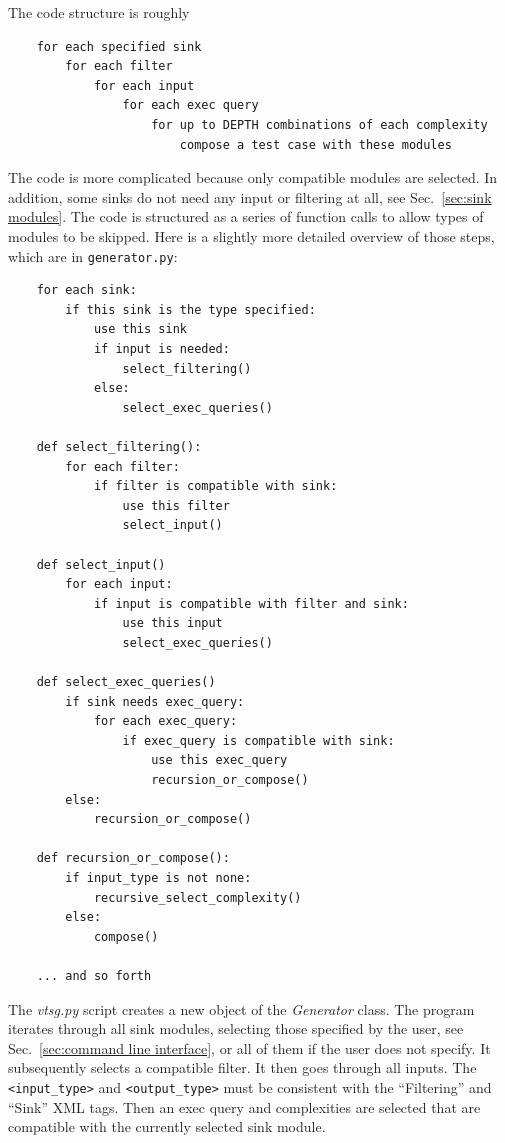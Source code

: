\documentclass[12pt]{article}
\begin{document}
The code structure is roughly
\begin{verbatim}
    for each specified sink
        for each filter
            for each input
                for each exec query
                    for up to DEPTH combinations of each complexity
                        compose a test case with these modules
\end{verbatim}
The code is more complicated because only compatible modules are 
selected.
In addition, some sinks do not need any input or filtering at all,
see Sec.~\ref{sec:sink modules}.
The
code is structured as a series of function calls to allow types
of modules to be skipped.  Here is a slightly more detailed
overview of those steps, which are in \verb|generator.py|:
\begin{verbatim}
    for each sink:
        if this sink is the type specified:
            use this sink
            if input is needed:
                select_filtering()
            else:
                select_exec_queries()
    
    def select_filtering():
        for each filter:
            if filter is compatible with sink:
                use this filter
                select_input()
    
    def select_input()
        for each input:
            if input is compatible with filter and sink:
                use this input
                select_exec_queries()

    def select_exec_queries()
        if sink needs exec_query:
            for each exec_query:
                if exec_query is compatible with sink:
                    use this exec_query
                    recursion_or_compose()
        else:
            recursion_or_compose()

    def recursion_or_compose():
        if input_type is not none:
            recursive_select_complexity()
        else:
            compose()

    ... and so forth
\end{verbatim}

The \emph{vtsg.py} script creates a new object of the
\emph{Generator} class. 
The program iterates through all sink modules, selecting those
specified by the user, see
Sec.~\ref{sec:command line interface}, 
or all of them if the user does not specify. It subsequently
selects a compatible filter.  It then goes through all inputs.
The \verb|<input_type>| and \verb|<output_type>|
must be consistent with the ``Filtering'' and ``Sink'' XML tags.
Then an exec query and complexities are selected
that are compatible with the currently selected sink module.
\end{document}
